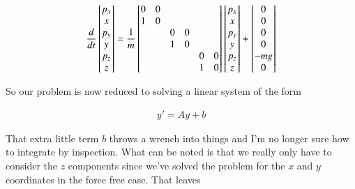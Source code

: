 \begin{align}\label{eqn:hamiltonian:roo4}
\frac{d}{dt}
\begin{bmatrix}
p_x \\
x \\
p_y \\
y \\
p_z \\
z \\
\end{bmatrix}
=
\frac{1}{m}
\begin{bmatrix}
0 & 0 &   &   &   &   \\
1 & 0 &   &   &   &   \\
  &   & 0 & 0 &   &   \\
  &   & 1 & 0 &   &   \\
  &   &   &   & 0 & 0 \\
  &   &   &   & 1 & 0 \\
\end{bmatrix}
\begin{bmatrix}
p_x \\
x \\
p_y \\
y \\
p_z \\
z \\
\end{bmatrix}
+
\begin{bmatrix}
0 \\
0 \\
0 \\
0 \\
-m g \\
0 \\
\end{bmatrix}
\end{align}

So our problem is now reduced to solving a linear system of the form

\begin{align}\label{eqn:hamiltonian:roo5}
y' = A y + b
\end{align}

That extra little term $b$ throws a wrench into things and I'm no longer sure how to integrate by inspection.  What can be noted is that we really only have to consider the $z$ components since we've solved the problem for the $x$ and $y$ coordinates in the force free case.  That leaves

